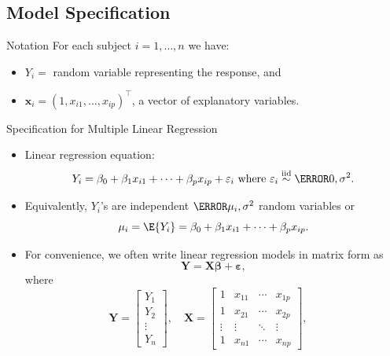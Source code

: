 \documentclass{article}\usepackage[]{graphicx}\usepackage[svgnames]{xcolor}
\newcommand*\circled[1]{\tikz[baseline=(char.base)]{\node[shape=circle,draw,inner sep=2pt] (char) {#1};}}
\newcommand{\iid}{\overset{\text{iid}}{\sim}}%
\providecommand{\RandomVector}[1]{\bm{#1}}%
\providecommand{\Vector}[1]{\bm{#1}}%
\providecommand{\Matrix}[1]{\bm{#1}}
\begin{document}
\subsection*{\circled{1} Model Specification}
\begin{Regular}{Notation}
      For each subject $ i=1,\ldots,n $ we have:
      \begin{itemize}
            \item $ Y_i = $ random variable representing the response, and
            \item $ \Vector{x}_i =(1,x_{i1},\ldots,x_{ip})^\top $, a vector of explanatory variables.
      \end{itemize}
\end{Regular}
\begin{Regular}{Specification for Multiple Linear Regression}
      \begin{itemize}
            \item Linear regression equation:
                  \[ Y_i=\beta_0+\beta_1x_{i1}+\cdots+\beta_p x_{ip}+\varepsilon_i\text{ where }\varepsilon_i \iid\N{0,\sigma^2}. \]
            \item Equivalently, $Y_i$'s are independent $ \N{\mu_i,\sigma^2} $ random variables or
                  \[ \mu_i=\E{Y_i}=\beta_0+\beta_1x_{i1}+\cdots+\beta_p x_{ip}. \]
            \item For convenience, we often write linear regression models in matrix form as
                  \[ \RandomVector{Y}=\Matrix{X}\Vector{\beta}+\RandomVector{\varepsilon}, \]
                  where
                  \[ \RandomVector{Y}=\begin{bmatrix}
                              Y_1    \\
                              Y_2    \\
                              \vdots \\
                              Y_n
                        \end{bmatrix},\quad
                        \Matrix{X}=\begin{bmatrix}
                              1      & x_{11} & \cdots & x_{1p} \\
                              1      & x_{21} & \cdots & x_{2p} \\
                              \vdots & \vdots & \ddots & \vdots \\
                              1      & x_{n1} & \cdots & x_{np}
                        \end{bmatrix},\quad
\]
\end{itemize}
\end{Regular}
\end{document}

